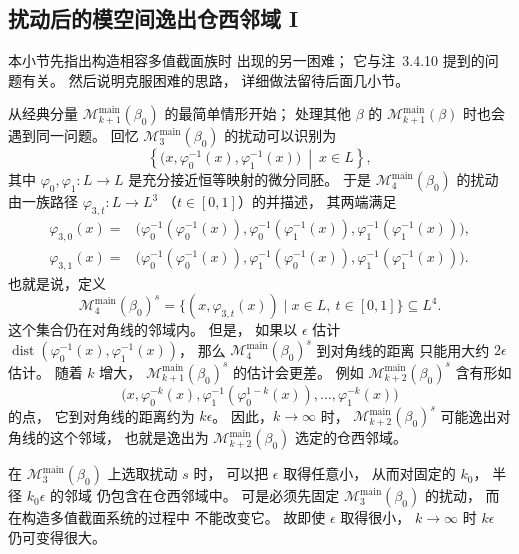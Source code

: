 
\subsection{扰动后的模空间逸出仓西邻域 I}
\label{subsec:7-2-3}

本小节先指出构造相容多值截面族时
出现的另一困难；
它与注~3.4.10 提到的问题有关。
然后说明克服困难的思路，
详细做法留待后面几小节。

从经典分量
$\mathcal M^{\mathrm{main}}_{k+1}(\beta_0)$
的最简单情形开始；
处理其他 $\beta$ 的
$\mathcal M^{\mathrm{main}}_{k+1}(\beta)$
时也会遇到同一问题。
回忆
$\mathcal M^{\mathrm{main}}_3(\beta_0)$
的扰动可以识别为
\[
\left\{
\bigl(x,\varphi_0^{-1}(x),
\varphi_1^{-1}(x)\bigr)
\ \middle|\ x\in L
\right\},
\]
其中
$\varphi_0,\varphi_1\colon L\to L$
是充分接近恒等映射的微分同胚。
于是
$\mathcal M^{\mathrm{main}}_4(\beta_0)$
的扰动由一族路径
$\varphi_{3,t}\colon L\to L^3$
（$t\in[0,1]$）的并描述，
其两端满足
\[
\begin{aligned}
\varphi_{3,0}(x)
={}&\bigl(
\varphi_0^{-1}(\varphi_0^{-1}(x)),
\varphi_0^{-1}(\varphi_1^{-1}(x)),
\varphi_1^{-1}(\varphi_1^{-1}(x))
\bigr),\\
\varphi_{3,1}(x)
={}&\bigl(
\varphi_0^{-1}(\varphi_0^{-1}(x)),
\varphi_1^{-1}(\varphi_0^{-1}(x)),
\varphi_1^{-1}(\varphi_1^{-1}(x))
\bigr).
\end{aligned}
\]
也就是说，定义
\begin{equation}
\mathcal M^{\mathrm{main}}_4(\beta_0)^s
=\{(x,\varphi_{3,t}(x))\mid
x\in L,\ t\in[0,1]\}
\subseteq L^4.
\tag{7.2.24}\label{eq:7-2-24}
\end{equation}
这个集合仍在对角线的邻域内。
但是，
如果以 $\epsilon$ 估计
$\operatorname{dist}
(\varphi_0^{-1}(x),\varphi_1^{-1}(x))$，
那么
$\mathcal M^{\mathrm{main}}_4(\beta_0)^s$
到对角线的距离
只能用大约 $2\epsilon$ 估计。
随着 $k$ 增大，
$\mathcal M^{\mathrm{main}}_{k+1}(\beta_0)^s$
的估计会更差。
例如
$\mathcal M^{\mathrm{main}}_{k+2}(\beta_0)^s$
含有形如
\begin{equation}
\bigl(
x,\varphi_0^{-k}(x),
\varphi_1^{-1}(\varphi_0^{1-k}(x)),
\ldots,\varphi_1^{-k}(x)
\bigr)
\tag{7.2.25}\label{eq:7-2-25}
\end{equation}
的点，
它到对角线的距离约为 $k\epsilon$。
因此，$k\to\infty$ 时，
$\mathcal M^{\mathrm{main}}_{k+2}(\beta_0)^s$
可能逸出对角线的这个邻域，
也就是逸出为
$\mathcal M^{\mathrm{main}}_{k+2}(\beta_0)$
选定的仓西邻域。

在
$\mathcal M^{\mathrm{main}}_3(\beta_0)$
上选取扰动 $s$ 时，
可以把 $\epsilon$ 取得任意小，
从而对固定的 $k_0$，
半径 $k_0\epsilon$ 的邻域
仍包含在仓西邻域中。
可是必须先固定
$\mathcal M^{\mathrm{main}}_3(\beta_0)$
的扰动，
而在构造多值截面系统的过程中
不能改变它。
故即使 $\epsilon$ 取得很小，
$k\to\infty$ 时
$k\epsilon$ 仍可变得很大。

